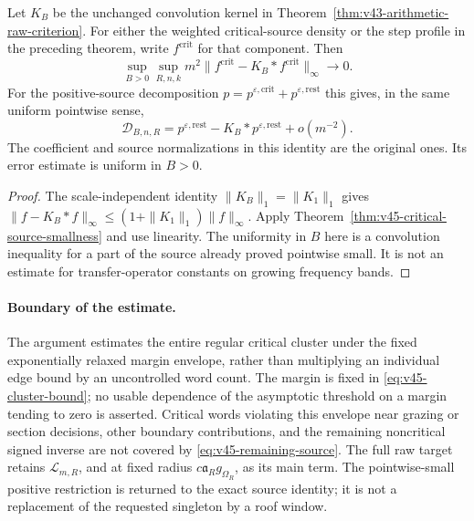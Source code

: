 \begin{corollary}
\label{cor:v45-critical-unsmoothing}
Let $K_B$ be the unchanged convolution kernel in
Theorem~\ref{thm:v43-arithmetic-raw-criterion}. For either the weighted
critical-source density or the step profile in the preceding theorem,
write $f^{\mathrm{crit}}$ for that component. Then
\begin{equation}\label{eq:v45-critical-all-band}
 \sup_{B>0}\sup_{R,n,k}m^2
             \|f^{\mathrm{crit}}-K_B*f^{\mathrm{crit}}\|_\infty
                                         \longrightarrow0.
\end{equation}
For the positive-source decomposition $p=p^{\varepsilon,\mathrm{crit}}
+p^{\varepsilon,\mathrm{rest}}$ this gives, in the same uniform
pointwise sense,
\begin{equation}\label{eq:v45-remaining-source}
 \mathscr D_{B,n,R}
   =p^{\varepsilon,\mathrm{rest}}-K_B*p^{\varepsilon,\mathrm{rest}}
                                      +o(m^{-2}).
\end{equation}
The coefficient and source normalizations in this identity are the
original ones. Its error estimate is uniform in $B>0$.
\end{corollary}
\begin{proof}
The scale-independent identity $\|K_B\|_1=\|K_1\|_1$ gives
$\|f-K_B*f\|_\infty\le(1+\|K_1\|_1)\|f\|_\infty$.
Apply Theorem~\ref{thm:v45-critical-source-smallness} and use linearity.
The uniformity in $B$ here is a convolution inequality for a part of
the source already proved pointwise small. It is not an estimate for
transfer-operator constants on growing frequency bands.
\end{proof}

\paragraph{Boundary of the estimate.}
The argument estimates the entire regular critical cluster under the
fixed exponentially relaxed margin envelope, rather than multiplying an individual edge
bound by an uncontrolled word count. The margin is fixed in
\eqref{eq:v45-cluster-bound}; no usable dependence of the asymptotic
threshold on a margin tending to zero is asserted. Critical words
violating this envelope near grazing or section decisions, other boundary contributions,
and the remaining noncritical signed inverse are not covered by
\eqref{eq:v45-remaining-source}. The full raw target retains
$\mathcal L_{m,R}$, and at fixed radius
$c\mathfrak a_Rg_{\Omega_R}$, as its main term. The pointwise-small
positive restriction is returned to the exact source identity; it
is not a replacement of the requested singleton by a roof window.
